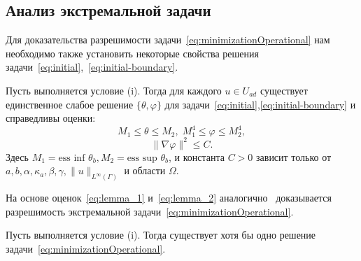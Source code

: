 \subsection{Анализ экстремальной задачи} \label{subsec:1_optimality}

Для доказательства разрешимости задачи~\eqref{eq:minimizationOperational}
нам необходимо также установить некоторые свойства решения задачи~\eqref{eq:initial},~\eqref{eq:initial-boundary}.

\begin{lem}
    \label{SolvabilityLemma}
    Пусть выполняется условие (i).
    Тогда для каждого $ u \in U_{ad} $ существует единственное слабое решение
    $\{\theta, \varphi \}$ для задачи~\eqref{eq:initial},\eqref{eq:initial-boundary} и справедливы оценки:
    \begin{equation}
        \label{eq:lemma_1}
        M_1 \le \theta \le M_2, \; M_1^4 \le \varphi \le M_2^4,
    \end{equation}
    \begin{equation}
        \label{eq:lemma_2}
        \| \nabla \varphi \|^2 \le C.
    \end{equation}
    Здесь $M_1 = \text{ess inf } \theta_b, M_2 = \text{ess sup } \theta_b$, и константа $C > 0$ зависит
    только от \\ $a, b, \alpha, \kappa_a, \beta, \gamma, \|u\|_{L^\infty(\Gamma)}$ и области $\Omega$.
\end{lem}

На основе оценок~\eqref{eq:lemma_1} и~\eqref{eq:lemma_2} аналогично~\cite{cheb_origin}
доказывается разрешимость экстремальной задачи~\eqref{eq:minimizationOperational}.
\begin{thm}
    Пусть выполняется условие (i).
    Тогда существует хотя бы одно решение задачи~\eqref{eq:minimizationOperational}.
\end{thm}



